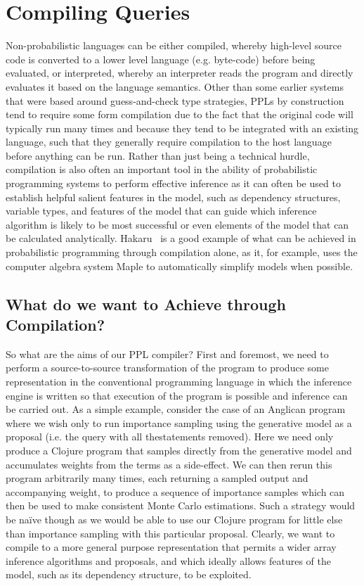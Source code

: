 
\section{Compiling Queries}
\label{sec:proginf:comp}

Non-probabilistic languages can be either compiled, whereby high-level source code
is converted to a lower level language (e.g. byte-code) before being evaluated, or interpreted,
whereby an interpreter reads the program and directly evaluates it based on the language
semantics.  Other than some earlier systems that were based around guess-and-check 
type strategies, PPLs by construction tend to require some form compilation due to the fact that
the original code will typically run many times and because they tend to be integrated
with an existing language, such that they generally require compilation to the host language
before anything can be run.  Rather than just being a technical hurdle, compilation is also 
often an important tool in the ability of probabilistic programming systems to perform
effective inference as it can often be used to establish helpful salient features in the model,
such as dependency structures, variable types, and features of the model that can guide
which inference algorithm is likely to be most successful or even elements of the model
that can be calculated analytically.  Hakaru~\citep{narayanan2016probabilistic} is a good
example of what can be achieved in probabilistic programming through compilation alone,
as it, for example, uses the computer algebra system Maple to automatically simplify models
when possible.

\subsection{What do we want to Achieve through Compilation?}
\label{sec:proginf:comp:want}

So what are the aims of our PPL compiler?  First and foremost, we need to
perform a source-to-source transformation of the program to
produce some representation in the conventional programming language in which
the inference engine is written so that execution of the program is possible and inference
can be carried out.  As a simple example, consider the case of an Anglican program where
we wish only to run importance sampling using the generative model as a proposal 
(i.e. the query with all the\observe statements removed).  Here we need only produce a Clojure program
that samples directly from the generative model and accumulates weights from the
\observe terms as a side-effect.  We can then rerun this program arbitrarily many
times, each returning a sampled output and accompanying weight, to produce a sequence
of importance samples which can then be used to make consistent Monte Carlo estimations.
Such a strategy would be na\"{i}ve though as we would be able to use our Clojure program
for little else than importance sampling with this particular proposal.  Clearly, we want
to compile to a more general purpose representation that permits a wider array inference algorithms
and proposals, and which ideally allows features of the model, such as its dependency
structure, to be exploited.

